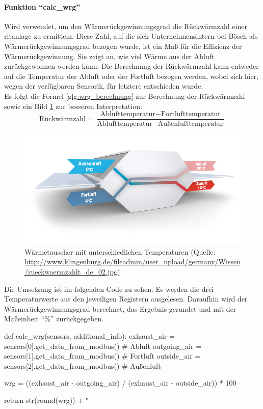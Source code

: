 \paragraph{Funktion \enquote{calc\_wrg}}
Wird verwendet, um den Wärmerückgewinnungsgrad \bzw die Rückwärmzahl einer \acs{rltanlage} zu ermitteln. Diese Zahl, auf die sich Unternehmensintern bei Bösch als Wärmerückgewinnungsgrad bezogen wurde, ist ein Maß für die Effizienz der Wärmerückgewinnung. Sie zeigt an, wie viel Wärme aus der Abluft zurückgewonnen werden kann. Die Berechnung der Rückwärmzahl kann entweder auf die Temperatur der Abluft oder der Fortluft bezogen werden, wobei sich hier, wegen der verfügbaren Sensorik, für letztere entschieden wurde. \cite[vgl.][]{Klingenburg:o.J.}\\
Es folgt die Formel \eqref{glg:wrg_berechnung} zur Berechnung der Rückwärmzahl sowie ein Bild \ref{fig:waermetauscher_wrg} zur besseren Interpretation: 
\begin{equation}
	\text{Rückwärmzahl} = \frac{\text{Ablufttemperatur} - \text{Fortlufttemperatur}}{\text{Ablufttemperatur} - \text{Außenlufttemperatur}}
	\label{glg:wrg_berechnung}
\end{equation} 

\begin{figure}[H]
	\centering
	\includegraphics[width=0.7\linewidth]{Bilder/rueckwaermzahl_waermetauscher}
	\caption{Wärmetauscher mit unterschiedlichen Temperaturen (Quelle: \url{http://www.klingenburg.de/fileadmin/user_upload/germany/Wissen/rueckwaermzahlt_de_02.jpg})}
	\label{fig:waermetauscher_wrg}
\end{figure}
 
Die Umsetzung ist im folgenden Code zu sehen. Es werden die drei Temperaturwerte aus den jeweiligen Registern ausgelesen. Daraufhin wird der Wärmerückgewinnungsgrad berechnet, das Ergebnis gerundet und mit der Maßeinheit \enquote{\%} zurückgegeben.

\begin{pythoncode}
def calc_wrg(sensors, additional_info):
	exhaust_air = sensors[0].get_data_from_modbus()  # Abluft
	outgoing_air = sensors[1].get_data_from_modbus()  # Fortluft
	outside_air = sensors[2].get_data_from_modbus()  # Außenluft
	
	wrg = ((exhaust_air - outgoing_air) / (exhaust_air - outside_air)) * 100
	
	return str(round(wrg)) + " %
\end{pythoncode}

